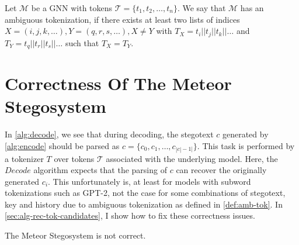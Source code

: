 \begin{definition}
	\label{def:amb-tok}
	Let $\mathcal{M}$ be a GNN with tokens $\mathcal{T} = \{ t_1, t_2, \dots, t_n \}$.
	We say that $\mathcal{M}$ has an ambiguous tokenization, if there exists at least two lists of indices $X = (i, j, k, \dots), Y = (q, r, s, \dots), X \neq Y$ with $T_X = t_i || t_j || t_k || \dots$ and $T_Y = t_q || t_r || t_s || \dots$ such that $T_X = T_Y$.
\end{definition}

\section{Correctness Of The Meteor Stegosystem}

In \autoref{alg:decode}, we see that during decoding, the stegotext $c$ generated by \autoref{alg:encode} should be parsed as $c = \{c_0,c_1, \dots, c_{|c|-1|}\}$.
This task is performed by a tokenizer $T$ over tokens $\mathcal{T}$ associated with the underlying model.
Here, the $Decode$ algorithm expects that the parsing of $c$ can recover the originally generated $c_i$.
This unfortunately is, at least for models with subword tokenizations such as GPT-2, not the case for some combinations of stegotext, key and history due to ambiguous tokenization as defined in \autoref{def:amb-tok}.
In \autoref{sec:alg-rec-tok-candidates}, I show how to fix these correctness issues.

\begin{theorem}
The Meteor Stegosystem is not correct.
\end{theorem}

